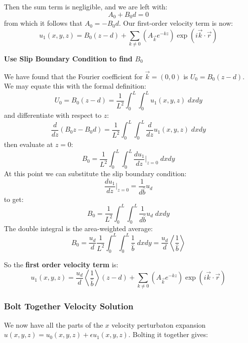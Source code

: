 \documentclass[12pt, a4paper, twoside, openright]{book}
\begin{document}
Then the sum term is negligible, and we are left with:
\begin{equation}
A_0 + B_0 d = 0
\end{equation}
from which it follows that $A_0 = - B_0 d $.  Our first-order velocity term is now:
\begin{equation}
u_1(x,y,z) =  B_0 (z - d) + \sum_{k \neq 0} 
\left(  A_{\vec{k}} e^{-kz} \right)
\exp(i \vec{k}\cdot \vec{r})
\end{equation}

\textbf{Use Slip Boundary Condition to find $B_0$}

We have found that the Fourier coefficient for $\vec{k} = (0,0)$ is $U_0 = B_0 (z - d)$.
We may equate this with the formal definition:
\begin{equation}
U_0 = B_0 (z - d) = \frac{1}{L^2} \int_0^L \int_0^L u_1(x,y,z) \;dxdy
\end{equation}
and differentiate with respect to $z$:
\begin{equation}
\frac{d}{dz} ( B_0 z - B_0 d) = \frac{1}{L^2} \int_0^L \int_0^L \frac{d}{dz} u_1(x,y,z) \;dxdy
\end{equation}
then evaluate at $z=0$:
\begin{equation}
B_0 = \frac{1}{L^2} \int_0^L \int_0^L \frac{d u_1}{dz} \rvert_{z=0} \;dxdy
\end{equation}
At this point we can substitute the slip boundary condition:
\begin{equation}
\frac{d u_1}{d z} \rvert_{z=0} = \frac{1}{d \hat{b}} u_d
\end{equation}
to get:
\begin{equation}
B_0 = \frac{1}{L^2} \int_0^L \int_0^L \frac{1}{d \hat{b}} u_d \;dxdy
\end{equation}
The double integral is the area-weighted average:
\begin{equation}
B_0 = \frac{u_d}{d} \frac{1}{L^2} \int_0^L \int_0^L \frac{1}{\hat{b}} \;dxdy
= \frac{u_d}{d} \left< \frac{1}{\hat{b}} \right>
\end{equation}

\vspace{1em}
So the \textbf{first order velocity term} is:
\begin{equation}
u_1(x,y,z) =  \frac{u_d}{d} \left< \frac{1}{\hat{b}} \right> (z - d)
 + \sum_{k \neq 0} 
\left(  A_{\vec{k}} e^{-kz} \right)
\exp(i \vec{k}\cdot \vec{r})
\end{equation}


\subsubsection*{Bolt Together Velocity Solution}
We now have all the parts of the $x$ velocity perturbaton expansion $u(x,y,z) = u_0(x,y,z) + \epsilon u_1(x,y,z)$.  Bolting it together gives:
\end{document}
